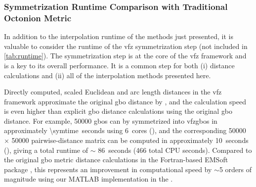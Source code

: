 \documentclass[final,twocolumn,12pt]{elsarticle}
\begin{document}
\subsubsection{Symmetrization Runtime Comparison with Traditional Octonion Metric}
\label{sec:results:efficiency:symruntime}
In addition to the interpolation runtime of the methods just presented, it is valuable to consider the runtime of the \gls{vfz} symmetrization step (not included in \cref{tab:runtime}). The symmetrization step is at the core of the \gls{vfz} framework and is a key to its overall performance. It is a common step for both (i) distance calculations and (ii) all of the interpolation methods presented here. 

Directly computed, scaled Euclidean and arc length distances in the \gls{vfz} framework approximate the original \gls{gbo} distance by \citet{francisGeodesicOctonionMetric2019}, and the calculation speed is even higher than explicit \gls{gbo} distance calculations using the original \gls{gbo} distance. For example, \num{50000} \glspl{gbo} can by symmetrized into \glspl{vfzgbo} in approximately \SI{\symtime}{seconds} using \SI{6}{cores} (), and the corresponding \num{50000} $\times$ \num{50000} pairwise-distance matrix can be computed in approximately \SI{10}{seconds} (), giving a total runtime of $\sim$ \SI{86}{seconds} (\num{466} total CPU seconds). Compared to the original \gls{gbo} metric distance calculations \cite{chesserLearningGrainBoundary2020} in the Fortran-based EMSoft package \cite{degraefEMSoft2020}, this represents an improvement in computational speed by $\sim$\num{5} orders of magnitude using our MATLAB implementation in the \vfzorepo{} \cite{bairdFiveDegreeofFreedom5DOF2020}.
\end{document}
